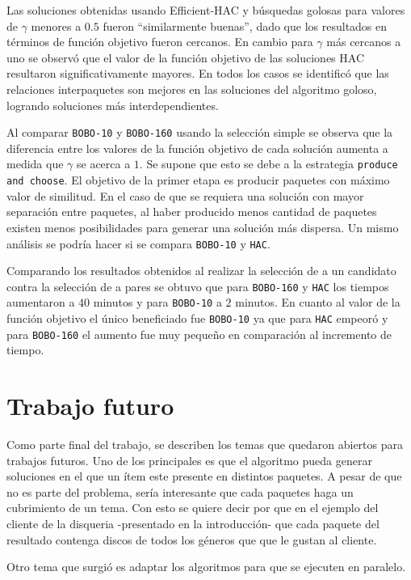 Las soluciones obtenidas usando Efficient-HAC y búsquedas golosas para valores de $\gamma$ menores a $0.5$ fueron \textquotedblleft similarmente buenas\textquotedblright , dado que los resultados en términos de función objetivo fueron cercanos. En cambio para $\gamma$ más cercanos a uno se observó que el valor de la función objetivo de las soluciones HAC resultaron significativamente mayores. En todos los casos se identificó que las relaciones interpaquetes son mejores en las soluciones del algoritmo goloso, logrando soluciones más interdependientes.

Al comparar \texttt{BOBO-10} y \texttt{BOBO-160} usando la selección simple se observa que la diferencia entre los valores de la función objetivo de cada solución aumenta a medida que $\gamma$ se acerca a $1$. Se supone que esto se debe a la estrategia \texttt{produce and choose}. El objetivo de la primer etapa es producir paquetes con máximo valor de similitud. En el caso de que se requiera una solución con mayor separación entre paquetes, al haber producido menos cantidad de paquetes existen menos posibilidades para generar una solución más dispersa. Un mismo análisis se podría hacer si se compara \texttt{BOBO-10} y \texttt{HAC}.

Comparando los resultados obtenidos al realizar la selección de a un candidato contra la selección de a pares se obtuvo que para \texttt{BOBO-160} y \texttt{HAC} los tiempos aumentaron a $40$ minutos y para \texttt{BOBO-10} a $2$ minutos. En cuanto al valor de la función objetivo el único beneficiado fue \texttt{BOBO-10} ya que para \texttt{HAC} empeoró y para \texttt{BOBO-160} el aumento fue muy pequeño en comparación al incremento de tiempo.

\section{Trabajo futuro}\label{sect:trabajo-futuro}

Como parte final del trabajo, se describen los temas que quedaron abiertos para trabajos futuros. Uno de los principales es que el algoritmo pueda generar soluciones en el que un ítem este presente en distintos paquetes. A pesar de que no es parte del problema, sería interesante que cada paquetes haga un cubrimiento de un tema. Con esto se quiere decir por que en el ejemplo del cliente de la disqueria -presentado en la introducción- que cada paquete del resultado contenga discos de todos los géneros que que le gustan al cliente.

Otro tema que surgió es adaptar los algoritmos para que se ejecuten en paralelo.

